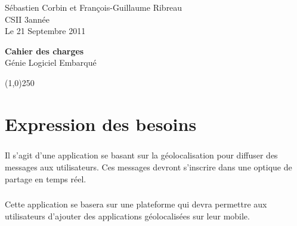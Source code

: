 \documentclass[a4paper,12pt]{report}
\begin{document}
	\begin{onehalfspace}

    \begin{titlepage}
      \begin{center}
        Sébastien Corbin et François-Guillaume Ribreau\\
        CSII 3\ieme année\\
    		Le 21 Septembre 2011\\
      \end{center}
      \hrulefill
      \vspace{7cm}
      \begin{center}
        \LARGE \textbf{Cahier des charges}\\
        \vspace{3cm}
        \normalsize Génie Logiciel Embarqué
      \end{center}

      \vspace{9,5cm}

      \begin{center}
      \line(1,0){250}
      \end{center}

      \begin{center}
      \tiny{\currfilename}
      \end{center}


    \end{titlepage}
    \clearpage

  \thispagestyle{empty}
  \setcounter{page}{0}
  \clearpage

	\chapter*{Expression des besoins}
	
	\paragraph*{}
	Il s'agit d'une application se basant sur la géolocalisation pour diffuser des messages aux utilisateurs. Ces messages devront s'inscrire dans une optique de partage en temps réel.
	
	\paragraph*{}
	Cette application se basera sur une plateforme qui devra permettre aux utilisateurs d'ajouter des applications géolocalisées sur leur mobile.		


\end{onehalfspace}
\end{document}
